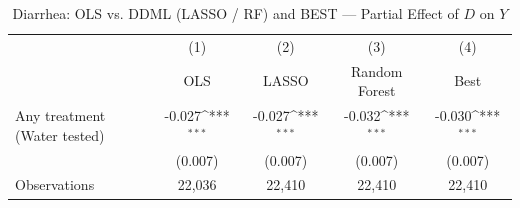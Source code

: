\begin{table}[htbp]\centering
\def\sym#1{\ifmmode^{#1}\else\(^{#1}\)\fi}
\caption{Diarrhea: OLS vs. DDML (LASSO / RF) and BEST — Partial Effect of $D$ on $Y$}
\begin{tabular}{l*{4}{c}}
\toprule
                &\multicolumn{1}{c}{(1)}&\multicolumn{1}{c}{(2)}&\multicolumn{1}{c}{(3)}&\multicolumn{1}{c}{(4)}\\
                &\multicolumn{1}{c}{OLS}&\multicolumn{1}{c}{LASSO}&\multicolumn{1}{c}{Random Forest}&\multicolumn{1}{c}{Best}\\
\midrule
Any treatment (Water tested)&   -0.027\sym{***}&   -0.027\sym{***}&   -0.032\sym{***}&   -0.030\sym{***}\\
                &  (0.007)         &  (0.007)         &  (0.007)         &  (0.007)         \\
\midrule
Observations    &   22,036         &   22,410         &   22,410         &   22,410         \\
\bottomrule
\end{tabular}
\end{table}
